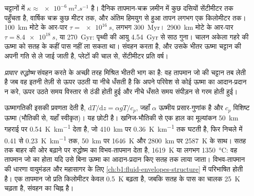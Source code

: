 चट्टानों में $\kappa \approx \qty{e-6}{m^2.s^{-1}}$ है। दैनिक तापमान-चक्र ज़मीन में कुछ दसियों सेंटीमीटर तक पहुँचता है, वार्षिक चक्र कुछ मीटर तक, और अंतिम हिमयुग से हुआ तापन लगभग एक किलोमीटर तक। \qty{100}{km} मोटे  के आर-पार $\tau = \qty{e16}{s}$, लगभग \qty{300}{Myr}। \qty{2900}{km} मोटे  के आर-पार $\tau = \qty{8.4e18}{s}$, या \qty{270}{Gyr}: पृथ्वी की आयु \qty{4.54}{Gyr} से साठ गुना। %
चालन अकेला गहरे  की ऊष्मा को सतह के कहीं पास नहीं ला सकता था।  संवहन करता है, और उसके भीतर ऊष्मा चट्टान की अपनी गति से ले जाई जाती है, प्लेटों की चाल से, सेंटीमीटर प्रति वर्ष। %

\begin{definition}[प्रावार रुद्धोष्म]\label{def:b1:heat-budget:adiabat}
\emph{प्रावार रुद्धोष्म} संवहन करते  के अच्छी तरह मिश्रित भीतरी भाग का  है: वह तापमान जो  की चट्टान तब लेती है जब वह इतनी तेज़ी से ऊपर उठती या नीचे धँसती है कि अपने परिवेश से कोई ऊष्मा का आदान-प्रदान न करे, ऊपर उठते समय विस्तार से ठंडी होती हुई और नीचे धँसते समय संपीड़न से गरम होती हुई।
\end{definition}

ऊष्मागतिकी इसकी प्रवणता देती है, $\mathrm dT/\mathrm dz = \alpha g T/c_p$, जहाँ $\alpha$ ऊष्मीय प्रसार-गुणांक है और $c_p$ विशिष्ट ऊष्मा (भौतिकी से, यहाँ स्वीकृत)। यह छोटी है। खनिज-भौतिकी से एक हाल का मूल्यांकन \qty{50}{km} गहराई पर \qty{0.54}{K.km^{-1}} देता है, जो \qty{410}{km} पर \qty{0.36}{K.km^{-1}} तक घटती है, फिर निचले  में 0.41 से \qty{0.23}{K.km^{-1}} तक, \qty{50}{km} पर \qty{1646}{K} और \qty{2800}{km} पर \qty{2587}{K} के साथ।
सतह तक बाहर की ओर बढ़ाने पर रुद्धोष्म  का विभव-तापमान देता है, \qty{1619}{K} या लगभग \qty{1350}{\degreeCelsius}: वह तापमान जो  का होता यदि उसे बिना ऊष्मा का आदान-प्रदान किए सतह तक लाया जाता। विभव-तापमान की धारणा वायुमंडल और महासागर के लिए \cref{ch:b1:fluid-envelopes-structure} में परिभाषित होती है। एक तापमान जो प्रति किलोमीटर केवल \qty{0.5}{K} बढ़ता है, जबकि सतह के पास का चालक  \qty{25}{K} चढ़ता है, संवहन का चिह्न है।

